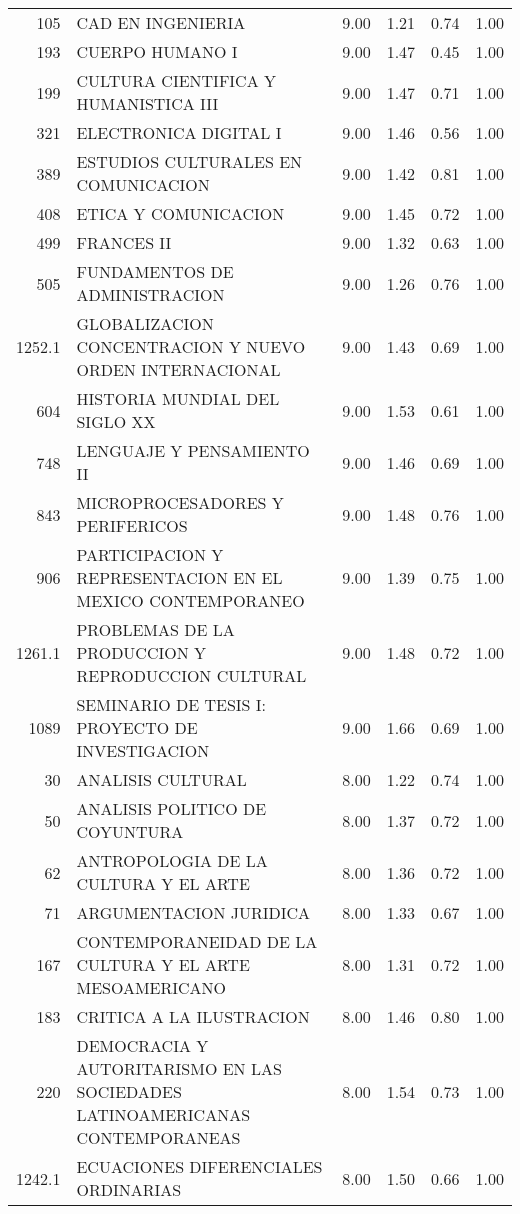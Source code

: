 \documentclass[12pt]{article}
\begin{document}
\begin{table}[ht]
\begin{tabular}{rlrrrr}
  105 & CAD EN INGENIERIA & 9.00 & 1.21 & 0.74 & 1.00 \\ 
  193 & CUERPO HUMANO I & 9.00 & 1.47 & 0.45 & 1.00 \\ 
  199 & CULTURA CIENTIFICA Y HUMANISTICA III & 9.00 & 1.47 & 0.71 & 1.00 \\ 
  321 & ELECTRONICA DIGITAL I & 9.00 & 1.46 & 0.56 & 1.00 \\ 
  389 & ESTUDIOS CULTURALES EN COMUNICACION & 9.00 & 1.42 & 0.81 & 1.00 \\ 
  408 & ETICA Y COMUNICACION & 9.00 & 1.45 & 0.72 & 1.00 \\ 
  499 & FRANCES II & 9.00 & 1.32 & 0.63 & 1.00 \\ 
  505 & FUNDAMENTOS DE ADMINISTRACION & 9.00 & 1.26 & 0.76 & 1.00 \\ 
  1252.1 & GLOBALIZACION CONCENTRACION Y NUEVO ORDEN INTERNACIONAL & 9.00 & 1.43 & 0.69 & 1.00 \\ 
  604 & HISTORIA MUNDIAL DEL SIGLO XX & 9.00 & 1.53 & 0.61 & 1.00 \\ 
  748 & LENGUAJE Y PENSAMIENTO II & 9.00 & 1.46 & 0.69 & 1.00 \\ 
  843 & MICROPROCESADORES Y PERIFERICOS & 9.00 & 1.48 & 0.76 & 1.00 \\ 
  906 & PARTICIPACION Y REPRESENTACION EN EL MEXICO CONTEMPORANEO & 9.00 & 1.39 & 0.75 & 1.00 \\ 
  1261.1 & PROBLEMAS DE LA PRODUCCION Y REPRODUCCION CULTURAL & 9.00 & 1.48 & 0.72 & 1.00 \\ 
  1089 & SEMINARIO DE TESIS I: PROYECTO DE INVESTIGACION & 9.00 & 1.66 & 0.69 & 1.00 \\ 
  30 & ANALISIS CULTURAL & 8.00 & 1.22 & 0.74 & 1.00 \\ 
  50 & ANALISIS POLITICO DE COYUNTURA & 8.00 & 1.37 & 0.72 & 1.00 \\ 
  62 & ANTROPOLOGIA DE LA CULTURA Y EL ARTE & 8.00 & 1.36 & 0.72 & 1.00 \\ 
  71 & ARGUMENTACION JURIDICA & 8.00 & 1.33 & 0.67 & 1.00 \\ 
  167 & CONTEMPORANEIDAD DE LA CULTURA Y EL ARTE MESOAMERICANO & 8.00 & 1.31 & 0.72 & 1.00 \\ 
  183 & CRITICA A LA ILUSTRACION & 8.00 & 1.46 & 0.80 & 1.00 \\ 
  220 & DEMOCRACIA Y AUTORITARISMO EN LAS SOCIEDADES LATINOAMERICANAS CONTEMPORANEAS & 8.00 & 1.54 & 0.73 & 1.00 \\ 
  1242.1 & ECUACIONES DIFERENCIALES ORDINARIAS & 8.00 & 1.50 & 0.66 & 1.00 \\ 

\end{tabular}
\end{table}
\end{document}
